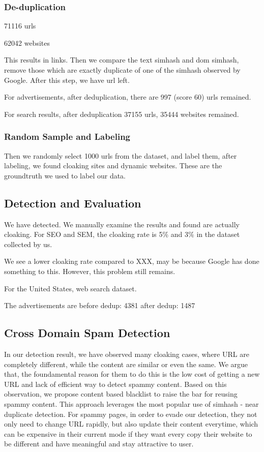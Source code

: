 \subsubsection{De-duplication}
71116 urls

62042 websites

This results in  links. Then we compare the text simhash and dom
simhash, remove those which are exactly duplicate of one of the simhash observed
by Google. After this step, we have  url left.

For advertisements, after deduplication, there are 997 (score 60) urls remained.

For search results, after deduplication 37155 urls, 35444 websites remained.

\subsubsection{Random Sample and Labeling}
Then we randomly select 1000 urls from the dataset, and label them, after
labeling, we found  cloaking sites and  dynamic websites.
These are the groundtruth we used to label our data.

\subsection{Detection and Evaluation}
We have detected.
We manually examine the results and found  are actually cloaking.
For SEO and SEM, the cloaking rate is 5\% and 3\% in the dataset collected by
us.

We see a lower cloaking rate compared to XXX, may be because Google has done
something to this. However, this problem still remains.

For the United States, web search dataset.

The advertisements are
before dedup: 4381
after dedup: 1487
\subsection{Cross Domain Spam Detection}
In our detection result, we have observed many cloaking cases, where URL are
completely different, while the content are similar or even the same.
We argue that, the foundamental reason for them to do this is the low cost of
getting a new URL and lack of efficient way to detect spammy content.
Based on this observation, we propose content based blacklist to raise the bar
for reusing spammy content. This approach leverages the most popular use of
simhash - near duplicate detection. For spammy pages, in order to evade our
detection, they not only need to change URL rapidly, but also update their
content everytime, which can be expensive in their current mode if they want
every copy their website to be different and have meaningful and stay attractive
to user.

